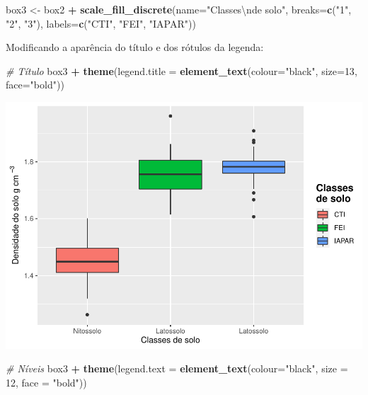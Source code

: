 \documentclass[
]{book}
\newenvironment{Shaded}{\begin{snugshade}}{\end{snugshade}}
\newcommand{\CharTok}[1]{\textcolor[rgb]{0.31,0.60,0.02}{#1}}
\newcommand{\CommentTok}[1]{\textcolor[rgb]{0.56,0.35,0.01}{\textit{#1}}}
\newcommand{\DataTypeTok}[1]{\textcolor[rgb]{0.13,0.29,0.53}{#1}}
\newcommand{\DecValTok}[1]{\textcolor[rgb]{0.00,0.00,0.81}{#1}}
\newcommand{\KeywordTok}[1]{\textcolor[rgb]{0.13,0.29,0.53}{\textbf{#1}}}
\newcommand{\NormalTok}[1]{#1}
\newcommand{\OperatorTok}[1]{\textcolor[rgb]{0.81,0.36,0.00}{\textbf{#1}}}
\newcommand{\StringTok}[1]{\textcolor[rgb]{0.31,0.60,0.02}{#1}}
\begin{document}
\begin{Shaded}
\begin{Highlighting}[]
\NormalTok{box3 <-}\StringTok{ }\NormalTok{box2 }\OperatorTok{+}
\StringTok{        }\KeywordTok{scale_fill_discrete}\NormalTok{(}\DataTypeTok{name=}\StringTok{"Classes}\CharTok{\textbackslash{}n}\StringTok{de solo"}\NormalTok{,}
                          \DataTypeTok{breaks=}\KeywordTok{c}\NormalTok{(}\StringTok{"1"}\NormalTok{, }\StringTok{"2"}\NormalTok{, }\StringTok{"3"}\NormalTok{),}
                          \DataTypeTok{labels=}\KeywordTok{c}\NormalTok{(}\StringTok{"CTI"}\NormalTok{, }\StringTok{"FEI"}\NormalTok{, }\StringTok{"IAPAR"}\NormalTok{))}
\end{Highlighting}
\end{Shaded}

Modificando a aparência do título e dos rótulos da legenda:

\begin{Shaded}
\begin{Highlighting}[]
\CommentTok{# Título}
\NormalTok{box3 }\OperatorTok{+}\StringTok{ }\KeywordTok{theme}\NormalTok{(}\DataTypeTok{legend.title =} \KeywordTok{element_text}\NormalTok{(}\DataTypeTok{colour=}\StringTok{"black"}\NormalTok{, }\DataTypeTok{size=}\DecValTok{13}\NormalTok{, }\DataTypeTok{face=}\StringTok{"bold"}\NormalTok{))}
\end{Highlighting}
\end{Shaded}

\includegraphics{TudodoR_files/figure-latex/unnamed-chunk-213-1.pdf}

\begin{Shaded}
\begin{Highlighting}[]
\CommentTok{# Níveis}
\NormalTok{box3 }\OperatorTok{+}\StringTok{ }\KeywordTok{theme}\NormalTok{(}\DataTypeTok{legend.text =} \KeywordTok{element_text}\NormalTok{(}\DataTypeTok{colour=}\StringTok{"black"}\NormalTok{, }\DataTypeTok{size =} \DecValTok{12}\NormalTok{, }\DataTypeTok{face =} \StringTok{"bold"}\NormalTok{))}
\end{Highlighting}
\end{Shaded}
\end{document}
